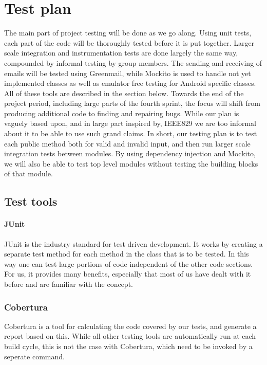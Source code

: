 \chapter{Test plan}

The main part of project testing will be done as we go along. Using unit tests, each part of the code will be thoroughly tested before it is put together. Larger scale integration and instrumentation tests are done largely the same way, compounded by informal testing by group members. The sending and receiving of emails will be tested using Greenmail, while Mockito is used to handle not yet implemented classes as well as emulator free testing for Android specific classes. All of these tools are described in the section below. Towards the end of the project period, including large parts of the fourth sprint, the focus will shift from producing additional code to finding and repairing bugs. While our plan is vaguely based upon, and in large part inspired by, IEEE829 \cite{bib:ieee} we are too informal about it to be able to use such grand claims. In short, our testing plan is to test each public method both for valid and invalid input, and then run larger scale integration tests between modules.
By using dependency injection and Mockito, we will also be able to test top level modules without testing the building blocks of that module. 

\section{Test tools}
\subsubsection{JUnit}
JUnit is the industry standard for test driven development. It works by creating a separate test method for each method in the class that is to be tested. In this way one can test large portions of code independent of the other code sections. For us, it provides many benefits, especially that most of us have dealt with it before and are familiar with the concept.

\subsection{Cobertura}
Cobertura is a tool for calculating the code covered by our tests, and generate a report based on this. While all other testing tools are automatically run at each build cycle, this is not the case with
Cobertura, which need to be invoked by a seperate command. 

